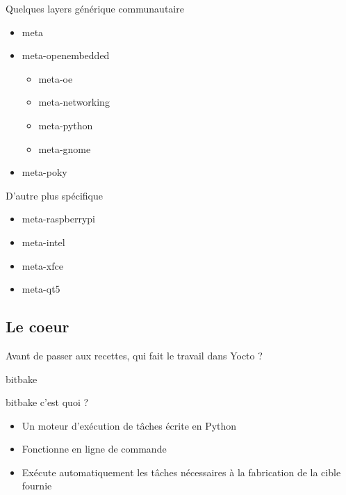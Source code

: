 \documentclass[compress]{smilebeamer}
\begin{document}
\begin{frame}
Quelques layers générique communautaire
\begin{itemize}
	\item meta
	\item meta-openembedded
	\begin{itemize}
		\item meta-oe
		\item meta-networking
		\item meta-python
		\item meta-gnome
	\end{itemize}
	\item meta-poky
\end{itemize}
D'autre plus spécifique
\begin{itemize}
	\item meta-raspberrypi
	\item meta-intel
	\item meta-xfce
	\item meta-qt5
\end{itemize}
\end{frame}


%
%
\subsection{Le coeur}

\begin{frame}
\begin{center}
\textcolor{smileOrange}{\huge{Avant de passer aux recettes, qui fait le travail dans Yocto ?}}
\end{center}
\end{frame}

\begin{frame}{bitbake}
\begin{block}{bitbake c'est quoi ?}
\begin{itemize}
	\item Un moteur d'exécution de tâches écrite en Python
	\item Fonctionne en ligne de commande
	\item Exécute automatiquement les tâches nécessaires à la fabrication de la cible fournie
\end{itemize}
\end{block}
\end{frame}
\end{document}
